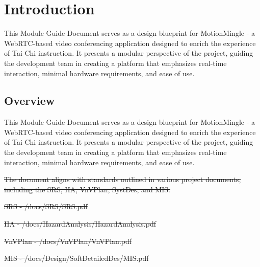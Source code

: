 \documentclass[12pt, titlepage]{article}
\begin{document}
\tableofcontents

\listoftables

\listoffigures

\newpage


\section{Introduction}

This Module Guide Document serves as a design blueprint for MotionMingle - a WebRTC-based video conferencing application designed to enrich the experience of Tai Chi instruction. It presents a modular perspective of the project, guiding the development team in creating a platform that emphasizes real-time interaction, minimal hardware requirements, and ease of use.

\subsection{Overview}
This Module Guide Document serves as a design blueprint for MotionMingle - a WebRTC-based video conferencing application designed to enrich the experience of Tai Chi instruction. It presents a modular perspective of the project, guiding the development team in creating a platform that emphasizes real-time interaction, minimal hardware requirements, and ease of use.

\sout{The document aligns with standards outlined in various project documents, including the SRS, HA, VnVPlan, SystDes, and MIS.} 

\sout{SRS - /docs/SRS/SRS.pdf}

\sout{HA - /docs/HazardAnalysis/HazardAnalysis.pdf}

\sout{VnVPlan - /docs/VnVPlan/VnVPlan.pdf}

\sout{MIS - /docs/Design/SoftDetailedDes/MIS.pdf}
\end{document}
